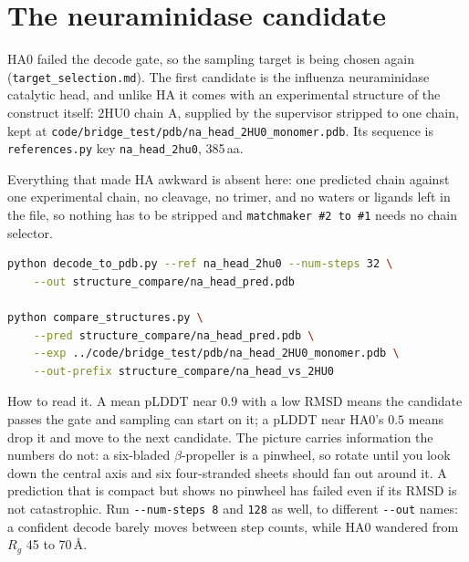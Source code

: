 \documentclass[11pt,a4paper]{article}
\newcommand{\file}[1]{\texttt{#1}}
\begin{document}
\section{The neuraminidase candidate}\label{sec:na}

HA0 failed the decode gate, so the sampling target is being chosen again
(\file{target\_selection.md}). The first candidate is the influenza neuraminidase
catalytic head, and unlike HA it comes with an experimental structure of the
construct itself: 2HU0 chain A, supplied by the supervisor stripped to one chain,
kept at \file{code/bridge\_test/pdb/na\_head\_2HU0\_monomer.pdb}. Its sequence is
\file{references.py} key \file{na\_head\_2hu0}, 385\,aa.

Everything that made HA awkward is absent here: one predicted chain against one
experimental chain, no cleavage, no trimer, and no waters or ligands left in the
file, so nothing has to be stripped and \file{matchmaker \#2 to \#1} needs no
chain selector.
\begin{lstlisting}[language=bash]
python decode_to_pdb.py --ref na_head_2hu0 --num-steps 32 \
    --out structure_compare/na_head_pred.pdb

python compare_structures.py \
    --pred structure_compare/na_head_pred.pdb \
    --exp ../code/bridge_test/pdb/na_head_2HU0_monomer.pdb \
    --out-prefix structure_compare/na_head_vs_2HU0
\end{lstlisting}

How to read it. A mean pLDDT near $0.9$ with a low RMSD means the candidate
passes the gate and sampling can start on it; a pLDDT near HA0's $0.5$ means drop
it and move to the next candidate. The picture carries information the numbers do
not: a six-bladed $\beta$-propeller is a pinwheel, so rotate until you look down
the central axis and six four-stranded sheets should fan out around it. A
prediction that is compact but shows no pinwheel has failed even if its RMSD is
not catastrophic. Run \file{-{}-num-steps 8} and \file{128} as well, to different
\file{-{}-out} names: a confident decode barely moves between step counts, while
HA0 wandered from $R_g$ 45 to 70\,\AA.
\end{document}

